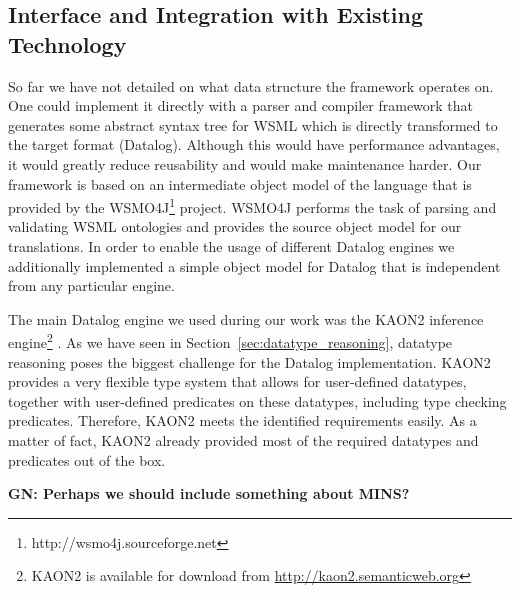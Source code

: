 \subsection{Interface and Integration with Existing Technology}
So far we have not detailed on what data structure the framework
operates on. One could implement it directly with a parser and
compiler framework that generates some abstract syntax tree for WSML
which is directly transformed to the target format (Datalog).
Although this would have performance advantages, it would greatly
reduce reusability and would make maintenance harder. Our framework is
based on an intermediate object model of the language that is
provided by the WSMO4J\footnote{http://wsmo4j.sourceforge.net}
project. WSMO4J performs the task of parsing and validating WSML ontologies and provides the source object model for our translations. In order to enable the usage of different Datalog
engines we additionally implemented a simple object model for
Datalog that is independent from any particular
engine.

The main Datalog engine we used during our work was the KAON2
inference engine\footnote{KAON2 is available for download from
\url{http://kaon2.semanticweb.org}} \cite{hustadt04reducing}. As we have seen in Section~\ref{sec:datatype_reasoning}, datatype reasoning poses the biggest challenge for the Datalog implementation.
KAON2 provides a very flexible type system that allows for
user-defined datatypes, together with user-defined predicates on
these datatypes, including type checking predicates. Therefore,
KAON2 meets the identified requirements easily. As a matter of
fact, KAON2 already provided most of the required datatypes and
predicates out of the box.

{\bf GN: Perhaps we should include something about MINS?}
